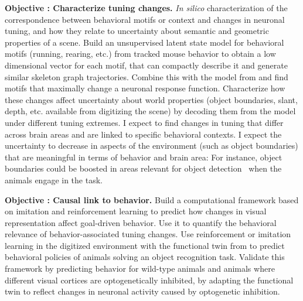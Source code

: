 \documentclass[COG,11pt]{ercgrant}
\begin{document}
\textbf{Objective : Characterize tuning changes.}  \textit{In silico} characterization of the correspondence between behavioral motifs or context and changes in neuronal tuning, and how they relate to uncertainty about semantic and geometric properties of a scene.  Build an unsupervised latent state model for behavioral motifs (running, rearing, etc.) from tracked mouse behavior to obtain a low dimensional vector for each motif, that can compactly describe it and generate similar skeleton graph trajectories. Combine this with the model from  and find motifs that maximally change a neuronal response function. Characterize how these changes affect uncertainty about world properties (object boundaries, slant, depth, etc. available from digitizing the scene) by decoding them from the model under different tuning extremes.  I expect to find changes in tuning that differ across brain areas and are linked to specific behavioral contexts. 
I expect the uncertainty to decrease in aspects of the environment (such as object boundaries) that are meaningful in terms of behavior and brain area: For instance, object boundaries could be boosted in areas relevant for object detection~\parencite{Froudarakis2019-yt} when the animals engage in the task.

\textbf{Objective : Causal link to behavior.}  Build a computational framework based on imitation and reinforcement learning to predict how changes in visual representation affect goal-driven behavior. 
Use it to quantify the behavioral relevance of behavior-associated tuning changes.
 Use reinforcement or imitation learning in the digitized environment with the functional twin from  to predict behavioral policies of animals solving an object recognition task. Validate this framework by predicting behavior for wild-type animals and animals where different visual cortices are optogenetically inhibited, by adapting the functional twin to reflect changes in neuronal activity caused by  optogenetic inhibition. 
\end{document}
